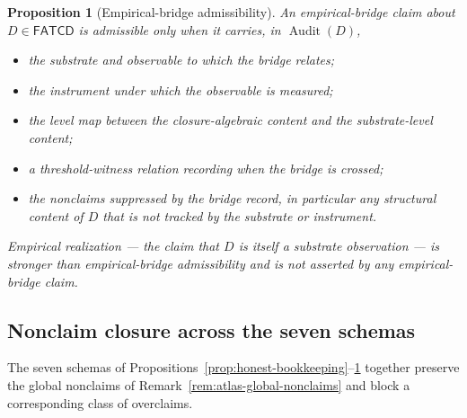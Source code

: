 \documentclass[11pt]{article}
\newtheorem{proposition}[theorem]{Proposition}
\theoremstyle{definition}
\newcommand{\FATCD}{\ensuremath{\mathsf{FATCD}}}
\newcommand{\Audit}[1]{\ensuremath{\operatorname{Audit}\!\left(#1\right)}}
\begin{document}
\begin{proposition}[Empirical-bridge admissibility]\label{prop:empirical-bridge}
An empirical-bridge claim about \(D \in \FATCD{}\) is admissible only when
it carries, in \(\Audit{D}\),
\begin{itemize}[topsep=2pt,itemsep=1pt]
  \item the substrate and observable to which the bridge relates;
  \item the instrument under which the observable is measured;
  \item the level map between the closure-algebraic content and the
    substrate-level content;
  \item a threshold-witness relation recording when the bridge is
    crossed;
  \item the nonclaims suppressed by the bridge record, in particular any
    structural content of \(D\) that is not tracked by the substrate or
    instrument.
\end{itemize}
Empirical realization --- the claim that \(D\) is itself a substrate
observation --- is stronger than empirical-bridge admissibility and is
not asserted by any empirical-bridge claim.
\end{proposition}


\subsection{Nonclaim closure across the seven schemas}\label{subsec:nonclaim-closure}

The seven schemas of
Propositions~\ref{prop:honest-bookkeeping}--\ref{prop:empirical-bridge}
together preserve the global nonclaims of
Remark~\ref{rem:atlas-global-nonclaims} and block a corresponding
class of overclaims.
\end{document}
